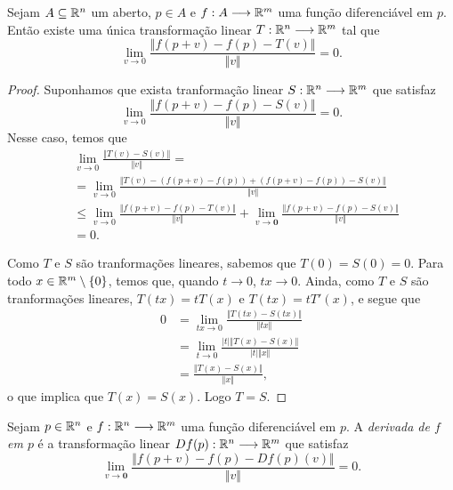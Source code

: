 \begin{prop}
	Sejam $A \subseteq \mathbb{R}^n$ um aberto, $p \in A$ e $f: A \longrightarrow \mathbb{R}^m$ uma função diferenciável em $p$. Então existe uma única transformação linear $T: \mathbb{R}^n \longrightarrow \mathbb{R}^m$ tal que
	\begin{equation*}
	\lim_{v \to 0} \frac{\Vert f(p+v)-f(p)-T(v) \Vert}{\Vert v \Vert} = 0.
	\end{equation*}
\end{prop}
\begin{proof}
	Suponhamos que exista tranformação linear $S: \mathbb{R}^n \longrightarrow \mathbb{R}^m$ que satisfaz
	\begin{equation*}
	\lim_{v \to 0} \frac{\Vert f(p+v)-f(p)-S(v) \Vert}{\Vert v \Vert} = 0.
	\end{equation*}
Nesse caso, temos que
	\begin{align*}
	& \lim_{v \to 0} \frac{\Vert T(v)-S(v) \Vert}{\Vert v \Vert} = \\
	&= \lim_{v \to 0} \frac{\Vert T(v) - (f(p+v)-f(p)) + (f(p+v)-f(p)) - S(v) \Vert}{\Vert v \Vert} \\
	& \leq  \lim_{v \to 0} \frac{\Vert f(p+v)-f(p)-T(v) \Vert}{\Vert v \Vert} + \lim_{v \to \bm 0} \frac{\Vert f(p+v)-f(p)-S(v) \Vert}{\Vert v \Vert} \\
	&=0.
	\end{align*}
	
	Como $T$ e $S$ são tranformações lineares, sabemos que $T(0)=S(0)=0$. Para todo $x \in \mathbb{R}^m \setminus \{0\}$, temos que, quando $t \to 0$, $tx \to 0$. Ainda, como $T$ e $S$ são tranformações lineares, $T(tx)=tT(x)$ e $T(tx)=tT'(x)$, e segue que
	\begin{align*}
	0 &= \lim_{tx \to 0} \frac{\Vert T(tx)-S(tx) \Vert}{\Vert tx \Vert} \\
		&= \lim_{t \to 0} \frac{|t| \Vert T(x)-S(x) \Vert}{|t| \Vert x \Vert} \\
		&= \frac{\Vert T(x)-S(x) \Vert}{\Vert x \Vert},
	\end{align*}
o que implica que $T(x) = S(x)$. Logo $T=S$.
\end{proof}

\begin{nota}
	Sejam $p \in \mathbb{R}^n$ e $f: \mathbb{R}^n \longrightarrow \mathbb{R}^m$ uma função diferenciável em $p$. A \emph{derivada de $f$ em $p$} é a transformação linear $Df(p): \mathbb{R}^n \longrightarrow \mathbb{R}^m$ que satisfaz
	\begin{equation*}
	\lim_{v \to \bm 0} \frac{\Vert f(p+v) - f(p) - Df(p)(v) \Vert}{\Vert v \Vert} = 0.
	\end{equation*}
\end{nota}

